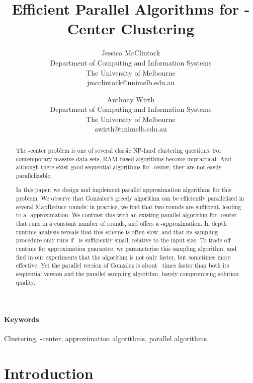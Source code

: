 \documentclass[11pt]{article}
\begin{document}
\title{\Large Efficient Parallel Algorithms for -Center Clustering}

\author{Jessica McClintock\\
{Department of Computing and Information Systems}\\
{The University of Melbourne}\\
{jmcclintock@unimelb.edu.au}
\and 
Anthony Wirth\\
{Department of Computing and Information Systems}\\
{The University of Melbourne}\\
awirth@unimelb.edu.au
}
\date{}
\maketitle



\begin{abstract} 
The -center problem is one of several classic NP-hard clustering questions.
For contemporary massive data sets, RAM-based algorithms become impractical.
And although there exist good sequential algorithms for -center, they are not easily parallelizable.

In this paper, we design and implement parallel approximation algorithms for
this problem.
We observe that Gonzalez's greedy algorithm can be efficiently parallelized in
several MapReduce rounds; in practice, we find that two rounds are sufficient,
leading to a -approximation.
We contrast this with an existing parallel algorithm for -center that runs
in a constant number of rounds, and offers a -approximation.
In depth runtime analysis reveals that this scheme is often slow, and that its
sampling procedure only runs if~ is sufficiently small, relative to the
input size.
To trade off runtime for approximation guarantee, we parameterize this
sampling algorithm, and find in our experiments that the algorithm is not only
faster, but sometimes more effective.
Yet the parallel version of Gonzalez is about~ times faster than both its
sequential version and the parallel sampling algorithm, barely compromising
solution quality.
\end{abstract}


\medskip
\paragraph*{Keywords}
\noindent
Clustering, -center, approximation algorithms, parallel algorithms.
 

\section{Introduction}
\end{document}

